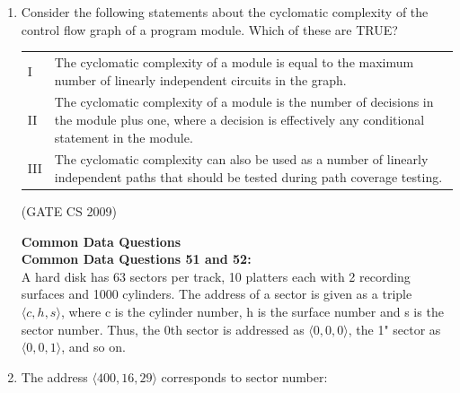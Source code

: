\documentclass[a4paper, 11pt]{article}
\begin{document}
\begin{enumerate}
    \item Consider the following statements about the cyclomatic complexity of the control flow graph of a program module. Which of these are TRUE?\\
    \begin{tabular}{ll}
        I & The cyclomatic complexity of a module is equal to the maximum number of linearly independent circuits in the graph. \\
        II & The cyclomatic complexity of a module is the number of decisions in the module plus one, where a decision is effectively any conditional statement in the module.\\
        III & The cyclomatic complexity can also be used as a number of linearly independent paths that should be tested during path coverage testing.\\
    \end{tabular}
    \begin{enumerate}
    \end{enumerate}
    
    
    \hfill (GATE CS 2009)

    \textbf{{\LARGE Common Data Questions}} \\
    \large\textbf{Common Data Questions 51 and 52:}\\
    A hard disk has 63 sectors per track, 10 platters each with 2 recording surfaces and 1000 cylinders. The address of a sector is given as a triple $\langle c,h,s \rangle$, where c is the cylinder number, h is the surface number and s is the sector number. Thus, the 0th sector is addressed as $\langle 0,0,0 \rangle$, the 1" sector as $\langle 0,0,1 \rangle $, and so on.
    \item The address $\langle 400,16,29 \rangle$ corresponds to sector number:
    \begin{enumerate}
    \end{enumerate}
    

\end{enumerate}
\end{document}
